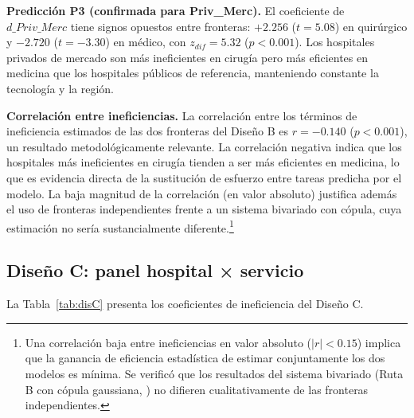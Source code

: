 \documentclass[12pt, a4paper]{article}
\begin{document}
\textbf{Predicción P3 (confirmada para Priv\_Merc).}
El coeficiente de $d\_Priv\_Merc$ tiene signos opuestos
entre fronteras: $+2.256$ ($t=5.08$) en quirúrgico y
$-2.720$ ($t=-3.30$) en médico, con $z_{dif}=5.32$
($p<0.001$). Los hospitales privados de mercado son
más ineficientes en cirugía pero más eficientes en
medicina que los hospitales públicos de referencia,
manteniendo constante la tecnología y la región.

\textbf{Correlación entre ineficiencias.} La correlación
entre los términos de ineficiencia estimados de las dos
fronteras del Diseño B es $r=-0.140$ ($p<0.001$), un
resultado metodológicamente relevante. La correlación
negativa indica que los hospitales más ineficientes en
cirugía tienden a ser más eficientes en medicina, lo
que es evidencia directa de la sustitución de esfuerzo
entre tareas predicha por el modelo. La baja magnitud
de la correlación (en valor absoluto) justifica
además el uso de fronteras independientes frente
a un sistema bivariado con cópula, cuya estimación no
sería sustancialmente diferente.\footnote{
  Una correlación baja entre ineficiencias en valor
  absoluto ($|r| < 0.15$) implica que la ganancia
  de eficiencia estadística de estimar conjuntamente
  los dos modelos es mínima. Se verificó que los
  resultados del sistema bivariado (Ruta B con cópula
  gaussiana, \citealp{kumbhakar1997}) no difieren
  cualitativamente de las fronteras independientes.}

\subsection{Diseño C: panel hospital × servicio}

La Tabla~\ref{tab:disC} presenta los coeficientes de
ineficiencia del Diseño C.
\end{document}
